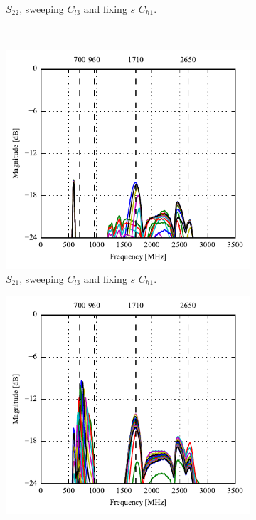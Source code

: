 \begin{figure}[htbp]
\begin{subfigure}[b]{0.49\linewidth}
        \caption{$S_{22}$, sweeping $C_{l3}$ and fixing $s\_C_{h1}$.}
    \end{subfigure}
    \\
    \begin{subfigure}[b]{0.49\linewidth}
        \centering
        \includegraphics{img/tech_sol/nonresonant/simulation/play_mode/s12_top_sweep.pdf}
        \caption{$S_{21}$, sweeping $C_{l3}$ and fixing $s\_C_{h1}$.}
    \end{subfigure}
    \hfill
    \begin{subfigure}[b]{0.49\linewidth}
        \centering
        \includegraphics{img/tech_sol/nonresonant/simulation/play_mode/s21_side_sweep.pdf}

\end{subfigure}
\end{figure}
